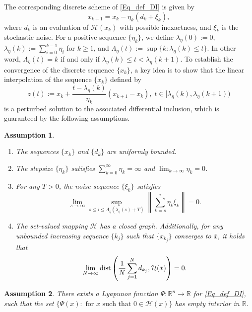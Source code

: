 \documentclass[11pt]{article}
\newcommand{\R}{\mathbb R}
\newcommand{\cH}{\mathcal H}
\def\norm#1{\left\|#1\right\|}
\newtheorem{assumption}{Assumption}[section]
\begin{document}
The corresponding discrete scheme of \eqref{Eq_def_DI} is given by
\begin{equation}
   \label{Eq:general_iterative}  x_{k+1}=x_k-\eta_k(d_k+\xi_k),
\end{equation}
where $d_k$ is an evaluation of $\cH(x_k)$ with possible inexactness, and $\xi_k$ is the stochastic noise. For a positive sequence $\{\eta_k\}$, we define $\lambda_\eta(0):=0$, $\lambda_\eta(k):=\sum_{i=0}^{k-1}\eta_i$ for $k\geq1$, and $\Lambda_\eta(t):=\sup\{k:\lambda_\eta(k)\leq t\}$. In other word, $\Lambda_\eta(t)=k$ if and only if $\lambda_\eta(k)\leq t<\lambda_\eta(k+1)$. To establish the convergence of the discrete sequence $\{x_k\}$, a key idea is to show that the linear interpolation of the sequence $\{x_k\}$ defined by
\begin{equation}
{z(t)}:=x_k+\frac{t-\lambda_\eta(k)}{\eta_k}(x_{k+1}-x_k),\;t\in[\lambda_\eta(k),\lambda_\eta(k+1))
\label{Eq:x(t)_def}
\end{equation}
is a perturbed solution \cite{benaim2005stochastic} to the associated differential inclusion, which is guaranteed by the following assumptions.
\begin{assumption}
\label{Assumption: DI}
    \begin{enumerate}
        \item The sequences $\{x_k\}$ and $\{d_k\}$ are uniformly bounded.
        \item The stepsize $\{\eta_k\}$ satisfies $\sum_{k=0}^\infty\eta_k=\infty$ and $\lim_{k\rightarrow\infty}\eta_k=0$.
        \item For any $T>0$, the noise sequence $\{\xi_k\}$ satisfies 
        \begin{equation*}
            \lim_{s\rightarrow\infty}\sup_{s\leq i\leq\Lambda_\eta(\lambda_\eta(s)+T)}\norm{\sum_{k=s}^i\eta_k\xi_k}=0.
        \end{equation*}       
        \item The set-valued mapping $\mathcal{H}$ has a closed graph. Additionally, for any unbounded increasing sequence $\{k_j\}$ such that $\{x_{k_j}\}$ converges to $\bar x$, it holds that 
        \begin{equation*}
            \lim_{N\rightarrow\infty}{\rm dist}\left(\frac{1}{N}\sum_{j=1}^Nd_{k_j},\mathcal{H}(\bar x)\right)=0.
        \end{equation*}
    \end{enumerate}
\end{assumption}

\begin{assumption}\label{assumption_Sard_Lyapunov}
There exists a Lyapunov function $\Psi:\R^n\to\R$ for \eqref{Eq_def_DI}, such that the set $\{\Psi(x): \text{ for $x$ such that $0\in\cH(x)$} \}$ has empty interior in $\R$.
\end{assumption}
\end{document}
